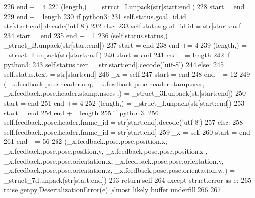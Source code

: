 \begin{DoxyCode}
226       end += 4
227       (length,) = \_struct\_I.unpack(str[start:end])
228       start = end
229       end += length
230       \textcolor{keywordflow}{if} python3:
231         self.status.goal\_id.id = str[start:end].decode(\textcolor{stringliteral}{'utf-8'})
232       \textcolor{keywordflow}{else}:
233         self.status.goal\_id.id = str[start:end]
234       start = end
235       end += 1
236       (self.status.status,) = \_struct\_B.unpack(str[start:end])
237       start = end
238       end += 4
239       (length,) = \_struct\_I.unpack(str[start:end])
240       start = end
241       end += length
242       \textcolor{keywordflow}{if} python3:
243         self.status.text = str[start:end].decode(\textcolor{stringliteral}{'utf-8'})
244       \textcolor{keywordflow}{else}:
245         self.status.text = str[start:end]
246       \_x = self
247       start = end
248       end += 12
249       (\_x.feedback.pose.header.seq, \_x.feedback.pose.header.stamp.secs, \_x.feedback.pose.header.stamp.nsecs
      ,) = \_struct\_3I.unpack(str[start:end])
250       start = end
251       end += 4
252       (length,) = \_struct\_I.unpack(str[start:end])
253       start = end
254       end += length
255       \textcolor{keywordflow}{if} python3:
256         self.feedback.pose.header.frame\_id = str[start:end].decode(\textcolor{stringliteral}{'utf-8'})
257       \textcolor{keywordflow}{else}:
258         self.feedback.pose.header.frame\_id = str[start:end]
259       \_x = self
260       start = end
261       end += 56
262       (\_x.feedback.pose.pose.position.x, \_x.feedback.pose.pose.position.y, \_x.feedback.pose.pose.position.z
      , \_x.feedback.pose.pose.orientation.x, \_x.feedback.pose.pose.orientation.y, 
      \_x.feedback.pose.pose.orientation.z, \_x.feedback.pose.pose.orientation.w,) = \_struct\_7d.unpack(str[start:end])
263       \textcolor{keywordflow}{return} self
264     \textcolor{keywordflow}{except} struct.error \textcolor{keyword}{as} e:
265       \textcolor{keywordflow}{raise} genpy.DeserializationError(e) \textcolor{comment}{#most likely buffer underfill}
266 
267 
\end{DoxyCode}
